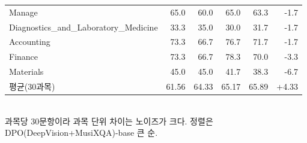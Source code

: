 \begin{table}[t]
\begin{tabular}{lrrrrr}
Manage & 65.0 & 60.0 & 65.0 & 63.3 & -1.7 \\
Diagnostics\_and\_Laboratory\_Medicine & 33.3 & 35.0 & 30.0 & 31.7 & -1.7 \\
Accounting & 73.3 & 66.7 & 76.7 & 71.7 & -1.7 \\
Finance & 73.3 & 66.7 & 78.3 & 70.0 & -3.3 \\
Materials & 45.0 & 45.0 & 41.7 & 38.3 & -6.7 \\
평균(30과목) & 61.56 & 64.33 & 65.17 & 65.89 & +4.33 \\
\bottomrule
\end{tabular}
\\[2pt]{\footnotesize 과목당 30문항이라 과목 단위 차이는 노이즈가 크다. 정렬은 DPO(DeepVision+MusiXQA)-base 큰 순.}
\end{table}
